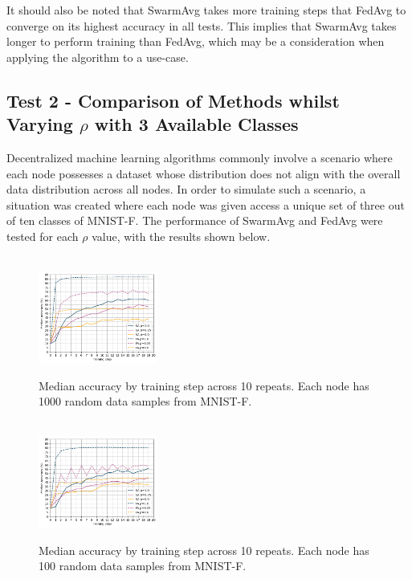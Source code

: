 \documentclass[letterpaper, 10 pt, conference]{ieeeconf}  %
\begin{document}
It should also be noted that SwarmAvg takes more training steps that FedAvg to converge on its highest accuracy in all tests. This implies that SwarmAvg takes longer to perform training than FedAvg, which may be a consideration when applying the algorithm to a use-case.

\subsection{Test 2 - Comparison of Methods whilst Varying $\rho$ with 3 Available Classes}
Decentralized machine learning algorithms commonly involve a scenario where each node possesses a dataset whose distribution does not align with the overall data distribution across all nodes. In order to simulate such a scenario, a situation was created where each node was given access a unique set of three out of ten classes of MNIST-F. The performance of SwarmAvg and FedAvg were tested for each $\rho$ value, with the results shown below.


\begin{figure}[H]
	 \\
	\includegraphics[width=0.35\textwidth]{conf_sparse_ns1000_cl3}
	\caption{Median accuracy by training step across 10 repeats. Each node has 1000 random data samples from MNIST-F.}
	\label{aeg7}
\end{figure}

\begin{figure}[H] 
	 \\
	\includegraphics[width=0.35\textwidth]{conf_sparse_ns100_cl3}
	\caption{Median accuracy by training step across 10 repeats. Each node has 100 random data samples from MNIST-F.}
	\label{aeg8}
\end{figure}
\end{document}
